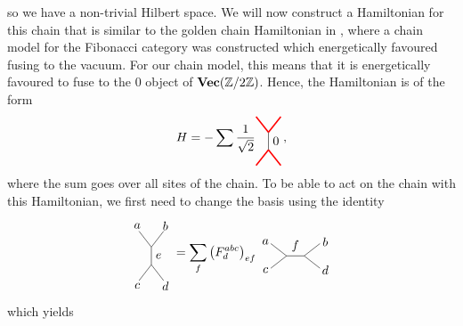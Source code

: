\noindent
so we have a non-trivial Hilbert space. We will now construct a Hamiltonian for this chain that is similar to the golden chain Hamiltonian in \cite{Feiguin2007}, where a chain model for the Fibonacci category was constructed which energetically favoured fusing to the vacuum. For our chain model, this means that it is energetically favoured to fuse to the $0$ object of $\textbf{Vec}(\mathbb{Z}/2\mathbb{Z})$. Hence, the Hamiltonian is of the form
	\begin{equation}
		H=-\sum \frac{1}{\sqrt{2}}
		\begin{tikzpicture}[scale=0.5,baseline=(current bounding box.center)]
			\draw[red,line width=0.4mm] (0,0) -- (-0.7,0.9);
			\draw[red,line width=0.4mm] (0,0) -- (0.7,0.9);
			\draw (0,0) to node[right] {$0$} (0,-1);
			\draw[red,line width=0.4mm] (0,-1) -- (-0.7,-1.9);
			\draw[red,line width=0.4mm] (0,-1) -- (0.7,-1.9);
		\end{tikzpicture},
	\end{equation}
where the sum goes over all sites of the chain. To be able to act on the chain with this Hamiltonian, we first need to change the basis using the identity
	\begin{equation}
		\begin{tikzpicture}[scale=0.5,baseline=(current bounding box.center)]
			\draw (0,0) -- (-0.7,0.9);
			\draw (0,0) -- (0.7,0.9);
			\draw (0,0) to node[right] {$e$} (0,-1);
			\draw (0,-1) -- (-0.7,-1.9);
			\draw (0,-1) -- (0.7,-1.9);
			\node at (0.8,1.2) {$b$};
			\node at (-0.8,1.2) {$a$};
			\node at (0.8,-2.2) {$d$};
			\node at (-0.8,-2.2) {$c$};
		\end{tikzpicture}=\sum_f\left(F_d^{abc}\right)_{ef}
		\begin{tikzpicture}[scale=0.5,baseline=(current bounding box.center)]
			\draw (0,0) -- (-0.9,0.7);
			\draw (0,0) -- (-0.9,-0.7);
			\draw (0,0) to node[above] {$f$} (1,0);
			\draw (1,0) -- (1.9,0.7);
			\draw (1,0) -- (1.9,-0.7);
			\node at (-1.2,0.8) {$a$};
			\node at (-1.2,-0.8) {$c$};
			\node at (2.2,0.8) {$b$};
			\node at (2.2,-0.8) {$d$};
		\end{tikzpicture}
	\end{equation}
which yields
